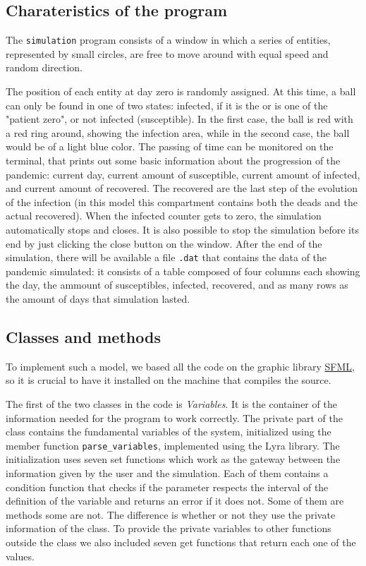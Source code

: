 \subsection{Charateristics of the program}

  The \verb|simulation| program consists of a window in which a series of entities, represented by small circles, are free to move around with equal speed and random direction.

  The position of each entity at day zero is randomly assigned. At this time, a ball can only be found in one of two states: infected, if it is the or is one of the "patient zero", or not infected (susceptible). In the first case, the ball is red with a red ring around, showing the infection area, while in the second case, the ball would be of a light blue color. The passing of time can be monitored on the terminal, that prints out some basic information about the progression of the pandemic:  current day,  current amount of susceptible,  current amount of infected, and  current amount of recovered. The recovered are the last step of the evolution of the infection (in this model this compartment contains both the deads and the actual recovered). When the infected counter gets to zero, the simulation automatically stops and closes. It is also possible to stop the simulation before its end by just clicking the close button on the window. After the end of the simulation, there will be available a file \verb|.dat| that contains the data of the pandemic simulated: it consists of a table composed of four columns each showing the day, the ammount of susceptibles, infected, recovered, and as many rows as the amount of days that simulation lasted.

\subsection{Classes and methods}

  To implement such a model, we based all the code on the graphic library \href{https://www.sfml-dev.org/}{SFML}, so it is crucial to have it installed on the machine that compiles the source.

  The first of the two classes in the code is \emph{Variables}. It is the container of the information needed for the program to work correctly. The private part of the class contains the fundamental variables of the system, initialized using the member function \verb|parse_variables|, implemented using the Lyra library. The initialization uses seven set functions which work as the gateway between the information given by the user and the simulation. Each of them contains a condition function that checks if the parameter respects the interval of the definition of the variable and returns an error if it does not. Some of them are methods some are not. The difference is whether or not they use the private information of the class. To provide the private variables to other functions outside the class we also included seven get functions that return each one of the values.

